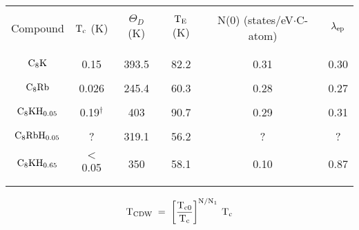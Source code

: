 {\newpage
\clearpage
\samepage \begin{table}\begin{center}

\vspace{0.5in}
\label{khcvtable}
\begin{tabular}{|c|ccccc|}
\hline
& & & & & \\ 
Compound & $\rm T_c$ (K) & $\Theta_D$ (K) & $\rm T_E$ (K) & N(0)
(states/eV$\cdot$C-atom) & $\rm \lambda_{ep}$\\ 
& & & & & \\ 
\hline
& & & & & \\ 
$\rm C_8K$ & 0.15 & 393.5& 82.2 & 0.31 & 0.30 \\ 
& & & & & \\ 
$\rm C_8Rb$  & 0.026 & 245.4 & 60.3 & 0.28 & 0.27 \\ 
& & & & & \\ 
$\rm C_8KH_{0.05}$ & 0.19$^{\dagger}$ & 403& 90.7 & 0.29 & 0.31 \\ 
& & & & & \\ 
$\rm C_8RbH_{0.05}$ & ? & 319.1 & 56.2 & ? & ? \\ 
& & & & & \\ 
$\rm C_8KH_{0.65}$  & $<$0.05 & 350& 58.1 & 0.10 & 0.87\\ 
& & & & & \\ 
& & & & & \\ 
\hline
\end{tabular}
\end{center}
\end{table}
}

{\newpage
\clearpage
\samepage \begin{figure}\vspace{16cm}

\label{khdos}
\end{figure}
}

{\newpage
\clearpage
\samepage \begin{figure}\vspace{18cm}

\label{tmdcHfig}
\end{figure}
}

{\newpage
\clearpage
\samepage \begin{figure}\vspace{15cm}

\label{tase2resist}
\end{figure}
}

{\newpage
\clearpage
\samepage \begin{equation}\label{bilbro}
\rm T_{CDW} \; = \; \left[ \frac{T_{c0}}{T_c} \right]^{N/N_1} \: T_c
\end{equation}
}

